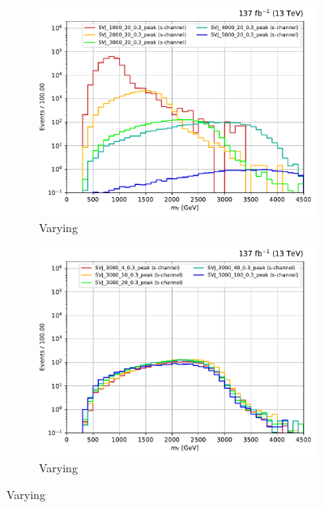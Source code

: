 \begin{figure}[htbp]
    \centering
    \begin{subfigure}[b]{0.48\textwidth}
        \includegraphics[width=\textwidth]{figures/s_channel_benchmark_variations/mZp.pdf}
        \caption{Varying \mZprime}
    \end{subfigure}
    \hfill
    \begin{subfigure}[b]{0.48\textwidth}
        \includegraphics[width=\textwidth]{figures/s_channel_benchmark_variations/mD.pdf}
        \caption{Varying \mDark}
    \end{subfigure}


\end{figure}
